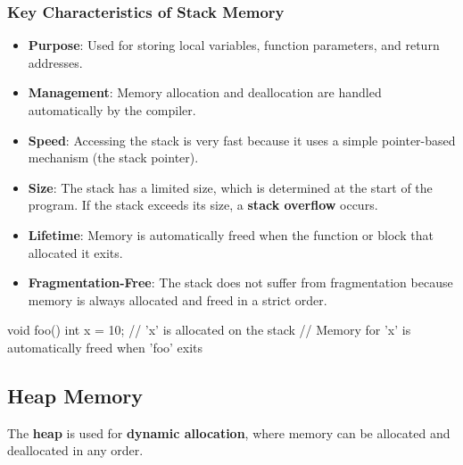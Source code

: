 \subsubsection{Key Characteristics of Stack Memory}
\begin{itemize}
    \item \textbf{Purpose}: Used for storing local variables, function parameters, and return addresses.
    \item \textbf{Management}: Memory allocation and deallocation are handled automatically by the compiler.
    \item \textbf{Speed}: Accessing the stack is very fast because it uses a simple pointer-based mechanism (the stack pointer).
    \item \textbf{Size}: The stack has a limited size, which is determined at the start of the program. If the stack exceeds its size, a \textbf{stack overflow} occurs.
    \item \textbf{Lifetime}: Memory is automatically freed when the function or block that allocated it exits.
    \item \textbf{Fragmentation-Free}: The stack does not suffer from fragmentation because memory is always allocated and freed in a strict order.
\end{itemize}


\begin{exampleblock}
    \begin{codeblock}[language=C++]
void foo() {
    int x = 10; // 'x' is allocated on the stack
    // Memory for 'x' is automatically freed when 'foo' exits
}
    \end{codeblock}
\end{exampleblock}

\subsection{Heap Memory}

\vspace{-0.5em}

The \textbf{heap} is used for \textbf{dynamic allocation}, where memory can be allocated and deallocated in any order.

